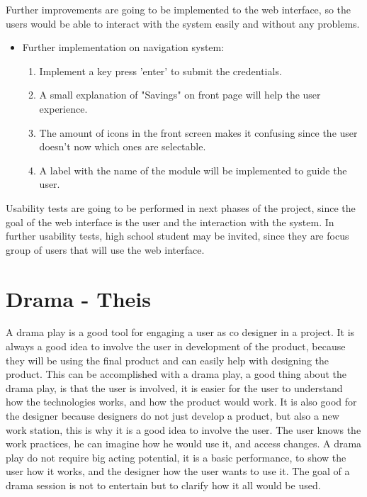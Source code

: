 Further improvements are going to be implemented to the web interface, so the users would be able to interact with the system easily and without any problems. \\
\begin{itemize}
	\item Further implementation on navigation system:
		\begin{enumerate}
			\item Implement a key press 'enter' to submit the credentials.
			\item A small explanation of "Savings" on front page will help the user experience.
			\item The amount of icons in the front screen makes it confusing since the user doesn't now which ones are selectable.
			\item  A label with the name of the module will be implemented to guide the user.
		\end{enumerate}
\end{itemize}

Usability tests are going to be performed in next phases of the project, since the goal of the web interface is the user and the interaction with the system. In further usability tests, high school student may be invited, since they are focus group of users that will use the web interface.

\section{Drama - Theis}
A drama play is a good tool for engaging a user as co designer in a project. It is always a good idea to involve the user in development of the product, because they will be using the final product and can easily help with designing the product. This can be accomplished with a drama play, a good thing about the drama play, is that the user is involved, it is easier for the user to understand how the technologies works, and how the product would work. It is also good for the designer because designers do not just develop a product, but also a new work station, this is why it is a good idea to involve the user. The user knows the work practices, he can imagine how he would use it, and access changes. A drama play do not require big acting potential, it is a basic performance, to show the user how it works, and the designer how the user wants to use it. The goal of a drama session is not to entertain but to clarify how it all would be used.

